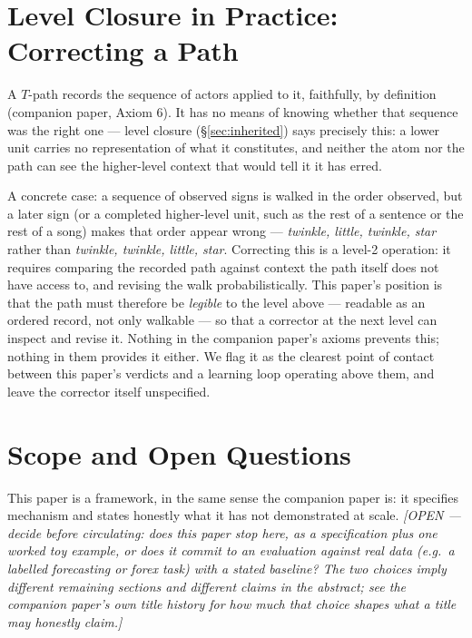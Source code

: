 \documentclass[12pt, a4paper]{article}
\begin{document}
\section{Level Closure in Practice: Correcting a Path}
\label{sec:level_closure_practice}

A $T$-path records the sequence of actors applied to it, faithfully,
by definition (companion paper, Axiom 6). It has no means of knowing
whether that sequence was the right one --- level closure
(\S\ref{sec:inherited}) says precisely this: a lower unit carries no
representation of what it constitutes, and neither the atom nor the
path can see the higher-level context that would tell it it has erred.

A concrete case: a sequence of observed signs is walked in the order
observed, but a later sign (or a completed higher-level unit, such as
the rest of a sentence or the rest of a song) makes that order appear
wrong --- \emph{twinkle, little, twinkle, star} rather than
\emph{twinkle, twinkle, little, star}. Correcting this is a level-2
operation: it requires comparing the recorded path against context the
path itself does not have access to, and revising the walk
probabilistically. This paper's position is that the path must
therefore be \emph{legible} to the level above --- readable as an
ordered record, not only walkable --- so that a corrector at the next
level can inspect and revise it. Nothing in the companion paper's
axioms prevents this; nothing in them provides it either. We flag it
as the clearest point of contact between this paper's verdicts and a
learning loop operating above them, and leave the corrector itself
unspecified.

\section{Scope and Open Questions}
\label{sec:scope}

This paper is a framework, in the same sense the companion paper is:
it specifies mechanism and states honestly what it has not
demonstrated at scale. \emph{[OPEN --- decide before circulating: does
this paper stop here, as a specification plus one worked toy example,
or does it commit to an evaluation against real data (e.g.\ a labelled
forecasting or forex task) with a stated baseline? The two choices
imply different remaining sections and different claims in the
abstract; see the companion paper's own title history for how much
that choice shapes what a title may honestly claim.]}
\end{document}
